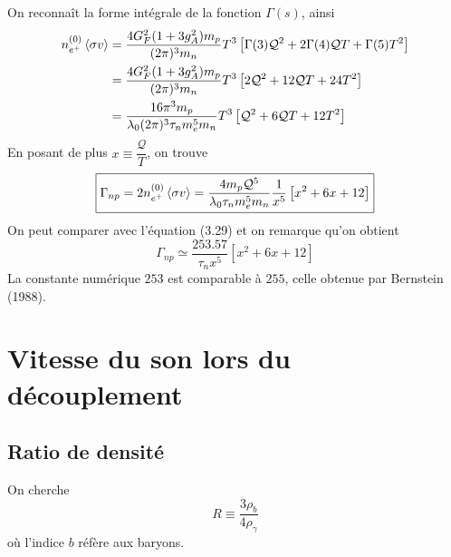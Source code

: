 \documentclass{article}
\numberwithin{equation}{section}
\begin{document}
On reconnaît la forme intégrale de la fonction $\Gamma(s)$, ainsi
\begin{align*}
        n_{e^{+}}^{(0)}\expval{\sigma v} &= 
        \frac{4 G_F^2(1 + 3g_A^2) m_p}{ (2\pi)^{3}m_n}T^3
        \left[\Gamma(3) \mathcal{Q}^{2} + 2\Gamma(4) \mathcal{Q}T
        + \Gamma(5)T^2 \right] \\
        &= 
        \frac{4 G_F^2(1 + 3g_A^2) m_p}{ (2\pi)^{3}m_n}T^3
        \left[ 2\mathcal{Q}^{2} + 12 \mathcal{Q}T
        + 24T^2 \right] \\
        &= 
        \frac{16 \pi^3 m_p}{ \lambda_0(2\pi)^{3}\tau_n m_e^5 m_n}T^3
        \left[ \mathcal{Q}^{2} + 6 \mathcal{Q}T
        + 12T^2 \right] \\
\end{align*}
En posant de plus $x \equiv \dfrac{\mathcal{Q}}{T}$, on trouve
\[
        \boxed{\Gamma_{np} = 2 n_{e^{+}}^{(0)} \expval{\sigma v} 
        = 
        \frac{ 4 m_p \mathcal{Q}^5}{ \lambda_0 \tau_n m_e^5 m_n} \frac{1}{x^5}
        \left[ x^2 + 6x 
+ 12 \right]}
\]
On peut comparer avec l'équation (3.29) et on remarque qu'on 
obtient
\[
        \boxed{\Gamma_{np} \simeq \frac{253.57}{\tau_n x^5} \left[ x^2 + 6x + 12 \right]}
\]
La constante numérique $253$ est comparable à $255$, 
celle obtenue par Bernstein (1988).

\section{Vitesse du son lors du découplement}


\subsection{Ratio de densité}
On cherche 
\[
        R \equiv \frac{3\rho_b}{4\rho_\gamma}
\]
où l'indice $b$ réfère aux baryons.
\end{document}
